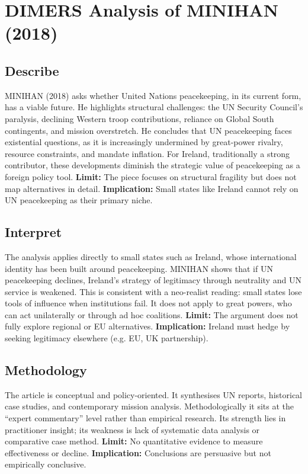 \section*{DIMERS Analysis of MINIHAN (2018)}

\subsection*{Describe}
\nocite{MINIHAN_2018} MINIHAN (2018) asks whether United Nations peacekeeping, in its current form, has a viable future. He highlights structural challenges: the UN Security Council’s paralysis, declining Western troop contributions, reliance on Global South contingents, and mission overstretch. He concludes that UN peacekeeping faces existential questions, as it is increasingly undermined by great-power rivalry, resource constraints, and mandate inflation. For Ireland, traditionally a strong contributor, these developments diminish the strategic value of peacekeeping as a foreign policy tool.  
\textbf{Limit:} The piece focuses on structural fragility but does not map alternatives in detail.  
\textbf{Implication:} Small states like Ireland cannot rely on UN peacekeeping as their primary niche.

\subsection*{Interpret}
The analysis applies directly to small states such as Ireland, whose international identity has been built around peacekeeping. MINIHAN shows that if UN peacekeeping declines, Ireland’s strategy of legitimacy through neutrality and UN service is weakened. This is consistent with a neo-realist reading: small states lose tools of influence when institutions fail. It does not apply to great powers, who can act unilaterally or through ad hoc coalitions.  
\textbf{Limit:} The argument does not fully explore regional or EU alternatives.  
\textbf{Implication:} Ireland must hedge by seeking legitimacy elsewhere (e.g. EU, UK partnership).

\subsection*{Methodology}
The article is conceptual and policy-oriented. It synthesises UN reports, historical case studies, and contemporary mission analysis. Methodologically it sits at the “expert commentary” level rather than empirical research. Its strength lies in practitioner insight; its weakness is lack of systematic data analysis or comparative case method.  
\textbf{Limit:} No quantitative evidence to measure effectiveness or decline.  
\textbf{Implication:} Conclusions are persuasive but not empirically conclusive.


